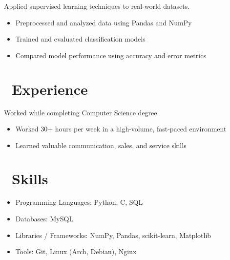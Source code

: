\documentclass{resume}
\begin{document}
Applied supervised learning techniques to real-world datasets.
\begin{itemize}
  \item Preprocessed and analyzed data using Pandas and NumPy
  \item Trained and evaluated classification models
  \item Compared model performance using accuracy and error metrics
\end{itemize}

\section{\faUsers\ Experience}

Worked while completing Computer Science degree.
\begin{itemize}
  \item Worked 30+ hours per week in a high-volume, fast-paced environment
  \item Learned valuable communication, sales, and service skills
\end{itemize}

\section{\faInfo\ Skills}
\begin{itemize}
  \item Programming Languages: Python, C, SQL
  \item Databases: MySQL
  \item Libraries / Frameworks: NumPy, Pandas, scikit-learn, Matplotlib
  \item Tools: Git, Linux (Arch, Debian), Nginx
\end{itemize}
\end{document}
